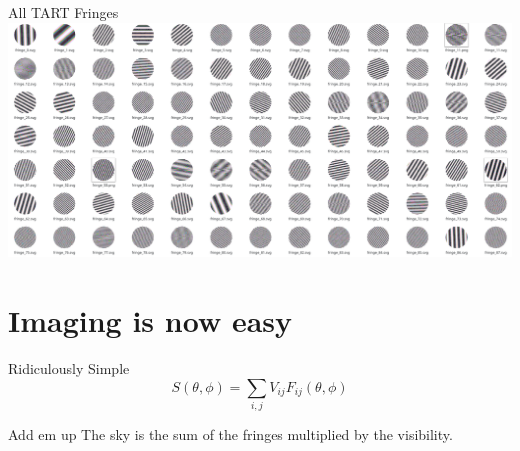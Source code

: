 \documentclass[ignorenonframetext]{beamer}
\begin{document}
\begin{frame}
\begin{columns}
\begin{column}{0.7\linewidth}
\begin{center}
  \end{center}
 \end{column}
\end{columns}
\end{frame}

\begin{frame}{All TART Fringes}
  \includegraphics[width=\linewidth]{images/all_fringes.png}
\end{frame}

\section{Imaging is now easy}

\frame{\tableofcontents[currentsection]}

\begin{frame}{Ridiculously Simple}
 \[ S(\theta, \phi) = \sum_{i,j} V_{ij} F_{ij}(\theta, \phi)\]
 \begin{block}{Add em up}
  The sky is the sum of the fringes multiplied by the visibility.
 \end{block}
\end{frame}
\end{document}
